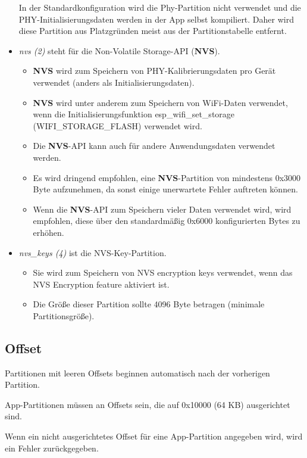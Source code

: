 \begin{itemize}
    In der Standardkonfiguration wird die Phy-Partition nicht verwendet und die PHY-Initialisierungsdaten werden in der App selbst kompiliert. Daher wird diese Partition aus Platzgründen meist aus der Partitionstabelle entfernt.
    \item \textit{nvs (2)} steht für die Non-Volatile Storage-API (\textbf{NVS}).
    \begin{itemize}
        \item \textbf{NVS} wird zum Speichern von PHY-Kalibrierungsdaten pro Gerät verwendet (anders als Initialisierungsdaten).
        \item \textbf{NVS} wird unter anderem zum Speichern von WiFi-Daten verwendet, wenn die Initialisierungsfunktion esp\_wifi\_set\_storage (WIFI\_STORAGE\_FLASH) verwendet wird.
        \item Die \textbf{NVS}-API kann auch für andere Anwendungsdaten verwendet werden.
        \item Es wird dringend empfohlen, eine \textbf{NVS}-Partition von mindestens 0x3000 Byte aufzunehmen, da sonst einige unerwartete Fehler auftreten können.
        \item Wenn die \textbf{NVS}-API zum Speichern vieler Daten verwendet wird, wird empfohlen, diese über den standardmäßig 0x6000 konfigurierten Bytes zu erhöhen.
    \end{itemize}
    \item \textit{nvs\_keys (4)} ist die \textmd{NVS}-Key-Partition.
    \begin{itemize}
        \item Sie wird zum Speichern von \textmd{NVS} encryption keys verwendet, wenn das \textmd{NVS} Encryption feature aktiviert ist.
        \item Die Größe dieser Partition sollte 4096 Byte betragen (minimale Partitionsgröße).
    \end{itemize}
\end{itemize}

\subsection{Offset}
Partitionen mit leeren Offsets beginnen automatisch nach der vorherigen Partition. 

App-Partitionen müssen an Offsets sein, die auf 0x10000 (64 KB) ausgerichtet sind.

Wenn ein nicht ausgerichtetes Offset für eine App-Partition angegeben wird, wird ein Fehler zurückgegeben.

